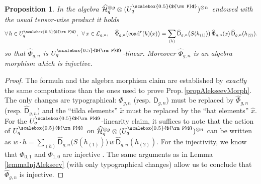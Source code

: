 \documentclass[11pt]{amsart}
\newtheorem{prop}[teo]{Proposition}
\newcommand{\Pup}{{\scalebox{0.5}{${\rm P}$}}}
\begin{document}
\begin{prop}\label{propModifAlekseev}
In the algebra $\widehat{\mathcal{H}}_q^{\otimes g} \otimes (U_q^\Pup)^{\otimes n}$ endowed with the usual tensor-wise product it holds
\[ \forall \, h \in U_q^\Pup, \:\: \forall \, x \in \mathcal{L}_{g,n}, \quad \widehat{\Phi}_{g,n}\bigl( \mathrm{coad}^r(h)(x) \bigr) = \sum_{(h)} \widehat{\mathsf{D}}_{g,n}\bigl( S(h_{(1)}) \bigr) \, \widehat{\Phi}_{g,n}(x) \, \widehat{\mathsf{D}}_{g,n}(h_{(2)}). \]
so that $\widehat{\Phi}_{g,n}$ is $U_q^\Pup$-linear. Moreover $\widehat{\Phi}_{g,n}$ is an algebra morphism which is injective.
\end{prop}
\begin{proof}
The formula and the algebra morphism claim are established by {\em exactly} the same computations than the ones used to prove Prop.\,\ref{propAlekseevMorph}. The only changes are typographical: $\Phi_{g,n}$ (resp. $\mathsf{D}_{g,n}$) must be replaced by $\widehat{\Phi}_{g,n}$ (resp. $\widehat{\mathsf{D}}_{g,n}$) and the ``tilda elements'' $\widetilde{x}$ must be replaced by the ``hat elements'' $\widehat{x}$. For the $U_q^\Pup$-linearity claim, it suffices to note that the action of $U_q^\Pup$ on $\widehat{\mathcal{H}}_q^{\otimes g} \otimes (U_q^\Pup)^{\otimes n}$ can be written as $w \cdot h = \textstyle \sum_{(h)} \widehat{\mathsf{D}}_{g,n}\bigl( S(h_{(1)}) \bigr) \, w \, \widehat{\mathsf{D}}_{g,n}(h_{(2)})$. For the injectivity, we know that $\Phi_{0,1}$ and $\Phi_{1,0}$ are injective \cite[Th.\,3.13]{BFR}. The same arguments as in Lemma \ref{lemmaInjAlekseev} (with only typographical changes) allow us to conclude that $\widehat{\Phi}_{g,n}$ is injective.
\end{proof}
\end{document}

